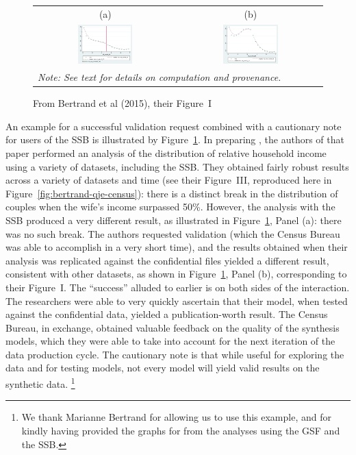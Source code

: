 \documentclass[12pt,titlepage]{article}
\begin{document}
\begin{figure}[htb]
\centering
\caption{From Bertrand et al (2015), their Figure~I}\label{fig:bertrand}
\begin{tabular}{cc}
(a) & (b)\\
\includegraphics[width=0.4\textwidth]{jma_graph_rel_earn3_syn}&
\includegraphics[width=0.4\textwidth]{jma_graph_rel_earn3}\\
\multicolumn{2}{l}{\tiny \it Note: See text for details on computation and provenance.}
\end{tabular}
\end{figure}

An example for a successful validation request combined with a cautionary note for users of the \ac{SSB} is illustrated by Figure~\ref{fig:bertrand}. In preparing \cite{Bertrand29012015}, the authors of that paper performed an analysis of the distribution of relative household income using a variety of datasets, including the \ac{SSB}. They obtained fairly robust results across a variety of datasets and time (see their Figure~III, reproduced here in Figure~\ref{fig:bertrand-qje-census}): there is a distinct break in the distribution of couples when the wife's income surpassed 50\%. However, the analysis with the \ac{SSB} produced a very different result, as illustrated in Figure~\ref{fig:bertrand}, Panel (a): there was no such break. The authors requested validation (which the Census Bureau was able to accomplish in a very short time), and the results obtained when their analysis was replicated against the confidential files yielded a different result, consistent with other datasets, as shown in Figure~\ref{fig:bertrand}, Panel (b), corresponding to their Figure~I. The ``success'' alluded to earlier is on both sides of the interaction. The researchers were able to very quickly ascertain that their model, when tested against the confidential data, yielded a publication-worth result. The Census Bureau, in exchange, obtained valuable feedback on the quality of the synthesis models, which they were able to take into account for the next iteration of the data production cycle. The cautionary note is that while useful for exploring the data and for testing models, not every model will yield valid results on the synthetic data.%
\footnote{We thank Marianne Bertrand for allowing us to use this example, and for kindly having provided the graphs for from the analyses using the \ac{GSF} and the \ac{SSB}.}
\end{document}
